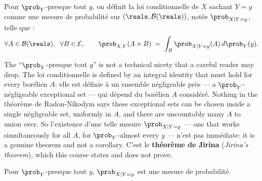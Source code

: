 \begin{definition}
  Pour $\prob_{Y}$-presque tout $y$, on définit la loi conditionnelle de $X$ sachant
  $Y = y$ comme une mesure de probabilité sur
  $(\reals,\mathcal{B}(\reals))$, notée $\prob_{X \mid Y = y}$, telle que :
  \[
    \forall A \in \mathcal{B}(\reals), \;\; \forall B \in \mathcal{E}, \qquad
    \prob_{X,Y}(A \times B) \;=\; \int_{B} \prob_{X \mid Y = y}(A) \, d\prob_{Y}(y) .
  \]
\end{definition}

\begin{remark}
  The ``$\prob_{Y}$-presque tout $y$'' is not a technical nicety that a careful
  reader may drop. The loi conditionnelle is defined by an integral identity that
  must hold for every borélien $A$: elle est définie à un ensemble négligeable près
  --- a $\prob_{Y}$-négligeable exceptional set --- qui dépend du borélien $A$
  considéré. Nothing in the théorème de Radon-Nikodym says these exceptional sets
  can be chosen inside a single négligeable set, uniformly in $A$, and there are
  uncountably many $A$ to union over. So l'existence d'une telle mesure
  $\prob_{X \mid Y = y}$ --- one that works simultaneously for all $A$, for
  $\prob_{Y}$-almost every $y$ --- n'est pas immédiate: it is a genuine theorem and
  not a corollary. C'est le \textbf{théorème de Jirina} (\textit{Jirina's theorem}),
  which this course states and does not prove.
\end{remark}

\begin{prop}
  Pour $\prob_{Y}$-presque tout $y$, $\prob_{X \mid Y = y}$ est une mesure de
  probabilité.
\end{prop}

